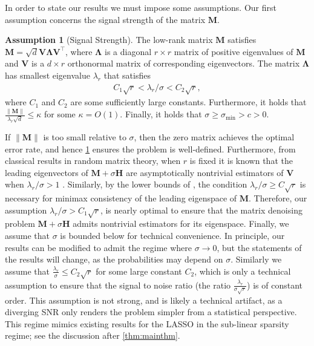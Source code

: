 \documentclass[10pt]{article}
\renewcommand{\t}{^{\top}}
\theoremstyle{definition}
\newtheorem{assumption}{Assumption}
\begin{document}
In order to state our results we must impose some assumptions. 
Our first assumption concerns the signal strength of the matrix $\bm{M}$. 
\begin{assumption}[Signal Strength] \label{ass1}
The low-rank matrix $\bm{M}$ satisfies $\bm{M} = \sqrt{d} \bm{V\Lambda V}\t$, where $\bm{\Lambda}$ is a diagonal $r\times r$ matrix of positive eigenvalues of $\bm{M}$ and $\bm{V}$ is a $d \times r$ orthonormal matrix of corresponding eigenvectors.  
The matrix $\bm{\Lambda}$ has smallest eigenvalue $\lambda_r$ that satisfies
\begin{align}
    C_1 \sqrt{r} < \lambda_r/\sigma < C_2 \sqrt{r},
\end{align}
where $C_1$ and $C_2$ are some sufficiently large constants. Furthermore, it holds that $\frac{\|\bm{M}\|}{\lambda_r \sqrt{d}} \leq \kappa$ for some $\kappa = O(1)$.  Finally, it holds that $\sigma \geq \sigma_{\min} > c > 0$. 
\end{assumption}
If $\|\bm{M}\|$ is too small relative to $\sigma$, then the zero matrix achieves the optimal error rate, and hence \cref{ass1} ensures the problem is well-defined.   Furthermore, from classical results in random matrix theory,  when $r$ is fixed it is known that the leading eigenvectors of $\bm{M} + \sigma \bm{H}$ are asymptotically nontrivial estimators of $\bm{V}$ when $\lambda_r/\sigma > 1$ \citep{benaych-georges_eigenvalues_2011}.  Similarly, by the lower bounds of \citet{cai_rate-optimal_2018}, the condition $\lambda_r/\sigma \geq C \sqrt{r}$ is necessary for minimax consistency of the leading eigenspace of $\bm{M}$.  Therefore, our assumption  $\lambda_r/\sigma > C_1 \sqrt{r}$, is nearly optimal to ensure that the matrix denoising problem $\bm{M} + \sigma \bm{H}$ admits nontrivial estimators for its eigenspace. 
Finally, we assume that $\sigma$ is bounded below for technical convenience. In principle, our results can be modified to admit the regime where $\sigma \to 0$, but the statements of the results will change, as the probabilities may depend on $\sigma$. Similarly we assume that $\frac{\lambda_r}{\sigma } \leq C_2 \sqrt{r}$ for some large constant $C_2$, which is only a technical assumption to ensure that the signal to noise ratio (the ratio $\frac{\lambda_r}{\sigma \sqrt{r}}$) is of constant order.  This assumption is not strong, and is likely a technical artifact, as a diverging SNR only renders the problem simpler from a statistical perspective.  This regime mimics existing results for the LASSO in the sub-linear sparsity regime; see the discussion after \cref{thm:mainthm}.  
\end{document}
